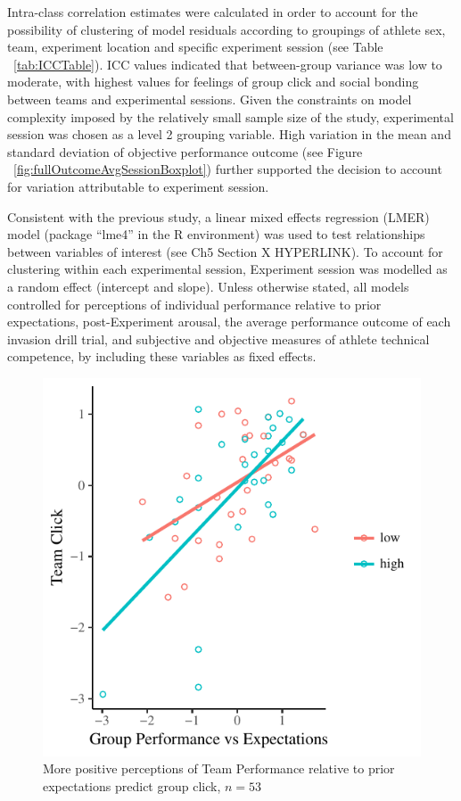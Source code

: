 

Intra-class correlation estimates were calculated in order to account for the possibility of clustering of model residuals according to groupings of athlete sex, team, experiment location and specific experiment session (see Table ~\ref{tab:ICCTable}). ICC values indicated that between-group variance was low to moderate, with highest values for feelings of group click and social bonding between teams and experimental sessions. Given the constraints on model complexity imposed by the relatively small sample size of the study, experimental session was chosen as a level 2 grouping variable. High variation in the mean and standard deviation of objective performance outcome (see Figure ~\ref{fig:fullOutcomeAvgSessionBoxplot}) further supported the decision to account for variation attributable to experiment session.

Consistent with the previous study, a linear mixed effects regression (LMER) model (package ``lme4'' in the R environment) was used to test relationships between variables of interest (see Ch5 Section X HYPERLINK). To account for clustering within each experimental session, Experiment session was modelled as a random effect (intercept and slope).  Unless otherwise stated, all models controlled for perceptions of individual performance relative to prior expectations, post-Experiment arousal, the average performance outcome of each invasion drill trial, and subjective and objective measures of athlete technical competence, by including these variables as fixed effects.







\begin{figure}
    \centering
    \includegraphics[width=0.5\linewidth,keepaspectratio] {images/teamPerfExpClickScatter-1}
    \caption{More positive perceptions of Team Performance relative to prior expectations predict group click, $n = 53$}
    \label{fig:teamPerfExpClickScatter}
\end{figure}

